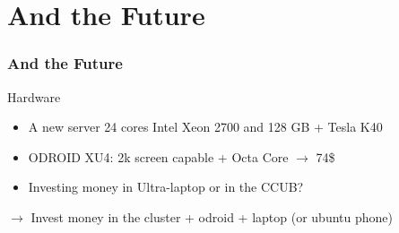 \documentclass{beamer}
\begin{document}
\section{And the Future}

\begin{frame}
  \frametitle{And the Future}
  \begin{block}{Hardware}\footnotesize
      \begin{itemize}
      \item A new server 24 cores Intel Xeon 2700 and 128 GB + Tesla K40
      \item ODROID XU4: 2k screen capable + Octa Core $\rightarrow$ 74\$
      \item Investing money in Ultra-laptop or in the CCUB?
      \end{itemize}
      $\rightarrow$ Invest money in the cluster + odroid + laptop (or ubuntu phone)
  \end{block}
  \begin{figure}
  \end{figure}
\end{frame}
\end{document}
